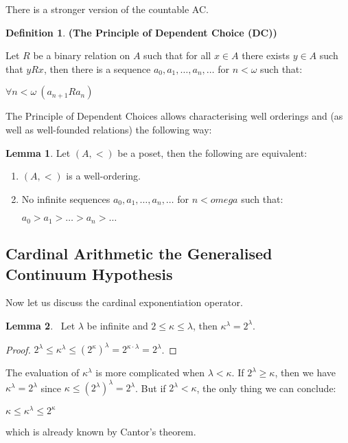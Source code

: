 \documentclass[8pt]{article}
\theoremstyle{definition}
\newtheorem{definition}{Definition}[section]
\theoremstyle{definition}
\theoremstyle{definition}
\theoremstyle{definition}
\theoremstyle{definition}
\theoremstyle{definition}
\theoremstyle{definition}
\theoremstyle{definition}
\newtheorem{lemma}{Lemma}[section]
\theoremstyle{definition}
\theoremstyle{definition}
\theoremstyle{definition}
\theoremstyle{definition}
\theoremstyle{definition}
\theoremstyle{definition}
\theoremstyle{question}
\begin{document}
There is a stronger version of the countable AC.
\begin{definition} {\bf (The Principle of Dependent Choice (DC))}

  Let $R$ be a binary relation on $A$ such that for all $x \in A$ there exists $y \in A$ such that $y R x$, then there is
  a sequence $a_0, a_1, \dots, a_n, \dots$ for $n < \omega$ such that:
  \begin{center}
    $\forall n < \omega \: (a_{n + 1} R a_n)$
  \end{center}
\end{definition}

The Principle of Dependent Choices allows characterising well orderings and (as well as well-founded relations) the following way:

\begin{lemma}
  Let $(A, <)$ be a poset, then the following are equivalent:

  \begin{enumerate}
    \item $(A, <)$ is a well-ordering.
    \item No infinite sequences $a_0, a_1, \dots, a_n, \dots$ for $n < omega$ such that:
    \begin{center}
      $a_0 > a_1 > \dots > a_n > \dots$
    \end{center}
  \end{enumerate}
\end{lemma}

\subsection{Cardinal Arithmetic the Generalised Continuum Hypothesis}

Now let us discuss the cardinal exponentiation operator.

\begin{lemma}~\label{card1}
  Let $\lambda$ be infinite and $2 \leq \kappa \leq \lambda$, then $\kappa^{\lambda} = 2^{\lambda}$.
\end{lemma}

\begin{proof}
  $2^{\lambda} \leq \kappa^{\lambda} \leq (2^{\kappa})^{\lambda} = 2^{\kappa \cdot \lambda} = 2^{\lambda}$.
\end{proof}

The evaluation of $\kappa^{\lambda}$ is more complicated when $\lambda < \kappa$.
If $2^{\lambda} \geq \kappa$, then we have $\kappa^{\lambda} = 2^{\lambda}$ since $\kappa \leq (2^{\lambda})^{\lambda} = 2^{\lambda}$.
But if $2^{\lambda} < \kappa$, the only thing we can conclude:
\begin{center}
  $\kappa \leq \kappa^{\lambda} \leq 2^{\kappa}$
\end{center}
which is already known by Cantor's theorem.
\end{document}
